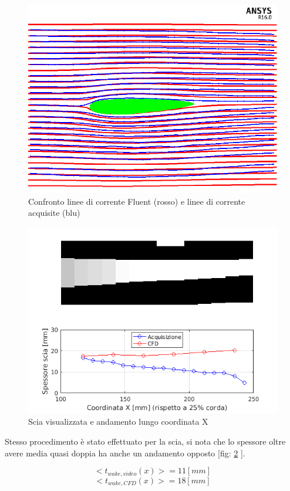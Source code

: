 \begin{figure}[H]
\centering
\includegraphics[scale=0.73]{Figure/Confronto.png}
\caption{Confronto linee di corrente Fluent (rosso) e linee di corrente acquisite (blu)}
\label{fig: Confronto linee di corrente}
\end{figure}


\begin{figure}[H]
\centering
\includegraphics[scale=0.9]{Figure/scia_sper.png}
\caption{Scia visualizzata e andamento lungo coordinata X }
\label{fig: Scia rilevata}
\end{figure}

Stesso procedimento è stato effettuato per la scia, si nota che lo spessore oltre avere media quasi doppia ha anche un andamento opposto [fig: \ref{fig: Scia rilevata} ].\\

\begin{center}
$$ < t_{wake,video}(x) > = 11  [mm] $$
$$ < t_{wake,CFD}(x) >   = 18  [mm] $$
\end{center}

